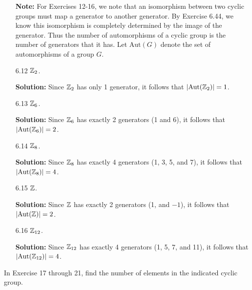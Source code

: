 \begin{enumerate}
   \item[\textbf{Note:}]   
               For Exercises 12-16, we note that an isomorphism between two
               cyclic groups must map a generator to another generator. By
               Exercise 6.44, we know this isomorphism is completely determined
               by the image of the generator. Thus the number of automorphisms
               of a cyclic group is the number of generators that it has. Let
               $\text{Aut}(G)$ denote the set of automorphisms of a group $G$.
   \item[6.12] $\mathbb{Z}_2$.
   
      \textbf{Solution:} Since $\mathbb{Z}_2$ has only 1 generator, it follows that
      $|\text{Aut}(\mathbb{Z}_2)| = 1$.
   \item[6.13] $\mathbb{Z}_6$.
   
      \textbf{Solution:} Since $\mathbb{Z}_6$ has exactly 2 generators (1 and 6), it
      follows that $|\text{Aut}(\mathbb{Z}_6)| = 2$.
   \item[6.14] $\mathbb{Z}_8$.
   
      \textbf{Solution:} Since $\mathbb{Z}_8$ has exactly 4 generators (1, 3, 5, and 7),
      it  follows that $|\text{Aut}(\mathbb{Z}_8)| = 4$.
   \item[6.15] $\mathbb{Z}$.
   
      \textbf{Solution:} Since $\mathbb{Z}$ has exactly 2 generators (1, and $-1$), it
      follows that $|\text{Aut}(\mathbb{Z})| = 2$.
   \item[6.16] $\mathbb{Z}_{12}$.
   
      \textbf{Solution:} Since $\mathbb{Z}_{12}$ has exactly 4 generators
      (1, 5, 7, and 11), it follows that $|\text{Aut}(\mathbb{Z}_{12})| = 4$.
\end{enumerate}

\noindent      In Exercise 17 through 21, find the number of elements in the
               indicated cyclic group.

